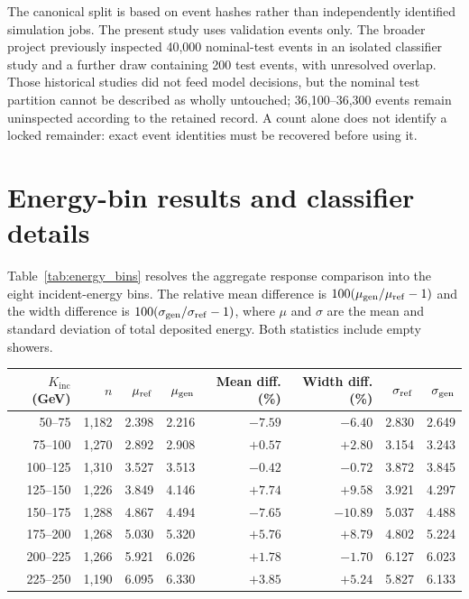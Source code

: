 \documentclass[11pt]{article}
\newcommand{\Kinc}{K_{\mathrm{inc}}}
\begin{document}
The canonical split is based on event hashes rather than independently identified simulation jobs. The present study uses validation events only. The broader project previously inspected 40,000 nominal-test events in an isolated classifier study and a further draw containing 200 test events, with unresolved overlap. Those historical studies did not feed model decisions, but the nominal test partition cannot be described as wholly untouched; 36,100--36,300 events remain uninspected according to the retained record. A count alone does not identify a locked remainder: exact event identities must be recovered before using it.

\clearpage
\section{Energy-bin results and classifier details}
\label{app:additional}

Table~\ref{tab:energy_bins} resolves the aggregate response comparison into the eight incident-energy bins. The relative mean difference is $100(\mu_{\rm gen}/\mu_{\rm ref}-1)$ and the width difference is $100(\sigma_{\rm gen}/\sigma_{\rm ref}-1)$, where $\mu$ and $\sigma$ are the mean and standard deviation of total deposited energy. Both statistics include empty showers.

\begin{center}
\begin{minipage}{\linewidth}
\centering
{}
\label{tab:energy_bins}
\small
\begin{tabular}{@{}rrrrrrrr@{}}
\toprule
$\Kinc$ (GeV) & $n$ & $\mu_{\rm ref}$ & $\mu_{\rm gen}$ & Mean diff. (\%) & Width diff. (\%) & $\sigma_{\rm ref}$ & $\sigma_{\rm gen}$ \\
\midrule
50--75 & 1,182 & 2.398 & 2.216 & $-7.59$ & $-6.40$ & 2.830 & 2.649 \\
75--100 & 1,270 & 2.892 & 2.908 & $+0.57$ & $+2.80$ & 3.154 & 3.243 \\
100--125 & 1,310 & 3.527 & 3.513 & $-0.42$ & $-0.72$ & 3.872 & 3.845 \\
125--150 & 1,226 & 3.849 & 4.146 & $+7.74$ & $+9.58$ & 3.921 & 4.297 \\
150--175 & 1,288 & 4.867 & 4.494 & $-7.65$ & $-10.89$ & 5.037 & 4.488 \\
175--200 & 1,268 & 5.030 & 5.320 & $+5.76$ & $+8.79$ & 4.802 & 5.224 \\
200--225 & 1,266 & 5.921 & 6.026 & $+1.78$ & $-1.70$ & 6.127 & 6.023 \\
225--250 & 1,190 & 6.095 & 6.330 & $+3.85$ & $+5.24$ & 5.827 & 6.133 \\
\bottomrule
\end{tabular}
\end{minipage}
\end{center}
\end{document}
